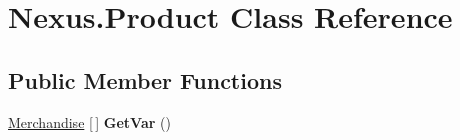 \hypertarget{class_nexus_1_1_product}{}\section{Nexus.\+Product Class Reference}
\label{class_nexus_1_1_product}
\subsection*{Public Member Functions}
\begin{DoxyCompactItemize}
\item 
\mbox{\label{class_nexus_1_1_product_ae703e4004dd647526f70dff7ac6c1100}} 
\mbox{\hyperlink{class_nexus_1_1_merchandise}{Merchandise}} \mbox{[}$\,$\mbox{]} {\bfseries Get\+Var} ()
\end{DoxyCompactItemize}

